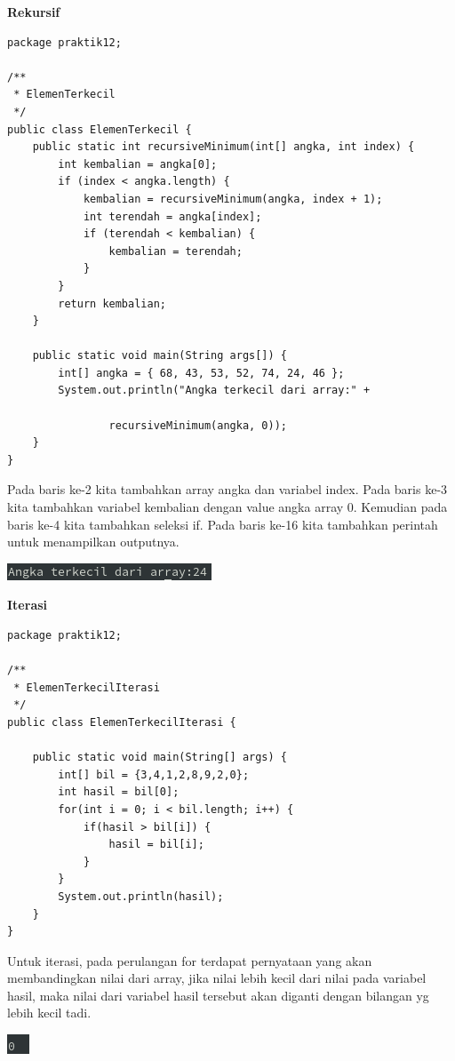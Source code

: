 \documentclass[a4paper,12pt]{article}
\begin{document}
\textbf{Rekursif}
\begin{lstlisting}
package praktik12;

/**
 * ElemenTerkecil
 */
public class ElemenTerkecil {
    public static int recursiveMinimum(int[] angka, int index) {
        int kembalian = angka[0];
        if (index < angka.length) {
            kembalian = recursiveMinimum(angka, index + 1);
            int terendah = angka[index];
            if (terendah < kembalian) {
                kembalian = terendah;
            }
        }
        return kembalian;
    }

    public static void main(String args[]) {
        int[] angka = { 68, 43, 53, 52, 74, 24, 46 };
        System.out.println("Angka terkecil dari array:" +

                recursiveMinimum(angka, 0));
    }
}

\end{lstlisting}
Pada baris ke-2 kita tambahkan array angka dan variabel index. Pada baris ke-3 kita tambahkan variabel kembalian dengan value angka array 0. Kemudian pada baris ke-4 kita tambahkan seleksi if. Pada baris ke-16 kita tambahkan perintah untuk menampilkan outputnya.
\begin{center}
    \includegraphics[scale=1]{7.png} 
\end{center}

\textbf{Iterasi}
\begin{lstlisting}
package praktik12;

/**
 * ElemenTerkecilIterasi
 */
public class ElemenTerkecilIterasi {

    public static void main(String[] args) {
        int[] bil = {3,4,1,2,8,9,2,0};
        int hasil = bil[0];
        for(int i = 0; i < bil.length; i++) {
            if(hasil > bil[i]) {
                hasil = bil[i];
            }
        }
        System.out.println(hasil);
    }
}
\end{lstlisting}
Untuk iterasi, pada perulangan for terdapat pernyataan yang akan membandingkan nilai dari array, jika nilai lebih kecil
dari nilai pada variabel hasil, maka nilai dari variabel hasil tersebut akan diganti dengan bilangan yg lebih kecil
tadi.
\begin{center}
    \includegraphics[scale=1]{8.png} 
\end{center}
\end{document}
